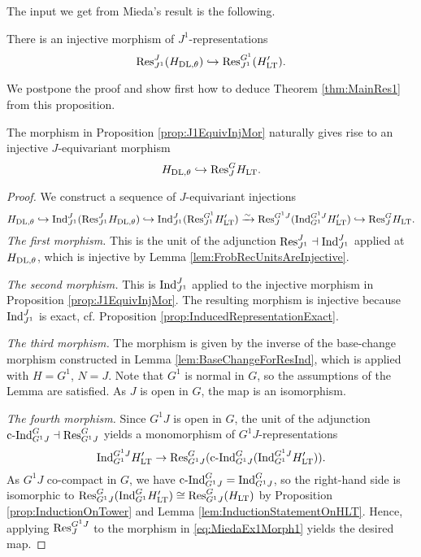\documentclass[../main.tex]{subfiles}
\begin{document}
The input we get from Mieda's result is the following.
\begin{prop}\label{prop:J1EquivInjMor}
  There is an injective morphism of  $J^1$-representations
  \begin{equation*} 
    \mathrm{Res}_{J^1}^J( H_{\mathrm{DL},\theta} ) \hookrightarrow \mathrm{Res}_{J^1}^{G^1}( H'_{\mathrm{LT}}).
  \end{equation*}
\end{prop}

We postpone the proof and show first how to deduce Theorem
\ref{thm:MainRes1} from this proposition. 

\begin{lem} \label{lem:JEquivInjMor}
  The morphism in Proposition \ref{prop:J1EquivInjMor} naturally gives rise to
  an injective $J$-equivariant morphism
  \begin{equation*}
    H_{\mathrm{DL},\theta} \hookrightarrow \mathrm{Res}_J^G H_{\mathrm{LT}}.
  \end{equation*}
\begin{proof}
  We construct a sequence of $J$-equivariant injections
  \begin{equation*}
    H_{\mathrm{DL},\theta} \hookrightarrow \mathrm{Ind}_{J^1}^J ( \mathrm{Res}_{J^1}^J H_{\mathrm{DL},\theta}) \hookrightarrow
    \mathrm{Ind}_{J^1}^J (\mathrm{Res}_{J^1}^{G^1} H'_{\mathrm{LT}}) \\ \xrightarrow{\sim} \mathrm{Res}_J^{G^1J}(
    \mathrm{Ind}_{G^1}^{G^1J} H'_{\mathrm{LT}}) 
 \hookrightarrow \mathrm{Res}_J^G H_{\mathrm{LT}}.
  \end{equation*}
  \textit{The first morphism.}
  This is the unit of the adjunction $\mathrm{Res}_{J^1}^J \dashv \mathrm{Ind}_{J^1}^J$ 
  applied at $H_{\mathrm{DL},\theta}$, which is injective by Lemma
  \ref{lem:FrobRecUnitsAreInjective}.

  \textit{The second morphism.}
  This is $\mathrm{Ind}_{J^1}^J$ applied to the injective morphism in Proposition
  \ref{prop:J1EquivInjMor}. The resulting morphism is injective because
  $\mathrm{Ind}_{J^1}^J$ is exact, cf. Proposition
  \ref{prop:InducedRepresentationExact}. 

  \textit{The third morphism.} 
  The morphism is given by the inverse of the base-change morphism constructed in
  Lemma \ref{lem:BaseChangeForResInd}, which is applied with $H = G^1$, $N = J$. 
  Note that $G^1$ is normal in $G$, so the assumptions of the Lemma are
  satisfied. As $J$ is open in $G$, the map is an isomorphism. 
  
  \textit{The fourth morphism.}
  Since $G^1J$ is open in $G$, the unit of the adjunction $\mathrm{c\text{-}Ind}_{G^1J}^G \dashv
  \mathrm{Res}_{G^1J}^G$ yields a monomorphism of $G^1J$-representations 
  \begin{equation}\label{eq:MiedaEx1Morph1}
    \mathrm{Ind}_{G^1}^{G^1J} H_{\mathrm{LT}}' \to \mathrm{Res}_{G^1J}^G
    (\mathrm{c\text{-}Ind}_{G^1J}^G(\mathrm{Ind}_{G^1}^{G^1J} H'_{\mathrm{LT}})).
  \end{equation}
  As $G^1J$ co-compact in $G$, we have $\mathrm{c\text{-}Ind}_{G^1J}^G =
  \mathrm{Ind}_{G^1J}^G$, so the right-hand
  side is isomorphic to $\mathrm{Res}_{G^1J}^G(\mathrm{Ind}_{G^1}^G H'_{\mathrm{LT}}) \cong
  \mathrm{Res}_{G^1J}^G(H_{\mathrm{LT}})$ by Proposition \ref{prop:InductionOnTower} and 
  Lemma \ref{lem:InductionStatementOnHLT}. Hence, applying $\mathrm{Res}_J^{G^1J}$ to the
  morphism in \eqref{eq:MiedaEx1Morph1} yields the desired map.
\end{proof}
\end{lem}
\end{document}
